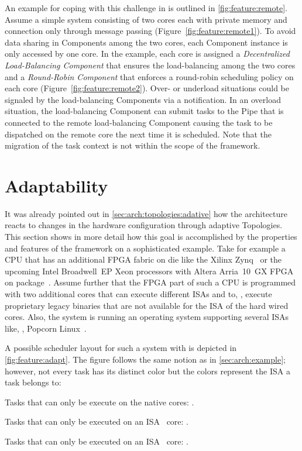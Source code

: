An example for coping with this challenge in \cobas{} is outlined in \cref{fig:feature:remote}. Assume a simple system consisting of two cores each with private memory and connection only through message passing (Figure~\ref{fig:feature:remote1}). To avoid data sharing in Components among the two cores, each Component instance is only accessed by one core. In the example, each core is assigned a \emph{Decentralized Load-Balancing Component} that ensures the load-balancing among the two cores and a \emph{Round-Robin Component} that enforces a round-robin scheduling policy on each core (Figure~\ref{fig:feature:remote2}). Over- or underload situations could be signaled by the load-balancing Components via a notification. In an overload situation, the load-balancing Component can submit tasks to the Pipe that is connected to the remote load-balancing Component causing the task to be dispatched on the remote core the next time it is scheduled. Note that the migration of the task context is not within the scope of the \cobas{} framework.


\section{Adaptability}

It was already pointed out in \cref{sec:arch:topologies:adative} how the \cobas{} architecture reacts to changes in the hardware configuration through adaptive Topologies. This section shows in more detail how this goal is accomplished by the properties and features of the \cobas{} framework on a sophisticated example. Take for example a \ac{CPU} that has an additional \ac{FPGA} fabric on die like the Xilinx Zynq~\cite{Xilinx-2016-Zynq} or the upcoming Intel Broadwell~EP Xeon processors with Altera Arria~10~GX \ac{FPGA} on package~\cite{HemsothIntel-2016-BroadwellFPGA}. Assume further that the \ac{FPGA} part of such a \ac{CPU} is programmed with two additional cores that can execute different \acp{ISA} \textalpha{} and \textbeta{} to, \eg{}, execute proprietary legacy binaries that are not available for the \ac{ISA} of the hard wired cores. Also, the system is running an operating system supporting several \acp{ISA} like, \eg{}, Popcorn Linux~\cite{Barbalace-2015-PopcornLinux}.

A possible scheduler layout for such a system with \cobas{} is depicted in \cref{fig:feature:adapt}. The figure follows the same notion as in \cref{sec:arch:example}; however, not every task has its distinct color but the colors represent the \ac{ISA} a task belongs to:
\begin{itemize*}
	\item  Tasks that can only be execute on the native cores: .
	\item Tasks that can only be executed on an \ac{ISA}~\textalpha{} core: .
	\item Tasks that can only be executed on an \ac{ISA}~\textbeta{} core: .
\end{itemize*}

